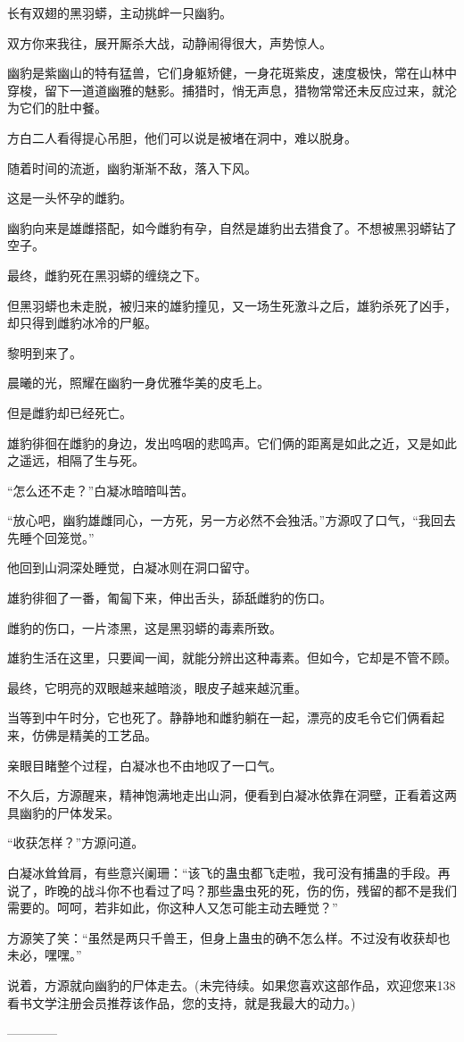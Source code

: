 \begin{this_body}
长有双翅的黑羽蟒，主动挑衅一只幽豹。

双方你来我往，展开厮杀大战，动静闹得很大，声势惊人。

幽豹是紫幽山的特有猛兽，它们身躯矫健，一身花斑紫皮，速度极快，常在山林中穿梭，留下一道道幽雅的魅影。捕猎时，悄无声息，猎物常常还未反应过来，就沦为它们的肚中餐。

方白二人看得提心吊胆，他们可以说是被堵在洞中，难以脱身。

随着时间的流逝，幽豹渐渐不敌，落入下风。

这是一头怀孕的雌豹。

幽豹向来是雄雌搭配，如今雌豹有孕，自然是雄豹出去猎食了。不想被黑羽蟒钻了空子。

最终，雌豹死在黑羽蟒的缠绕之下。

但黑羽蟒也未走脱，被归来的雄豹撞见，又一场生死激斗之后，雄豹杀死了凶手，却只得到雌豹冰冷的尸躯。

黎明到来了。

晨曦的光，照耀在幽豹一身优雅华美的皮毛上。

但是雌豹却已经死亡。

雄豹徘徊在雌豹的身边，发出呜咽的悲鸣声。它们俩的距离是如此之近，又是如此之遥远，相隔了生与死。

“怎么还不走？”白凝冰暗暗叫苦。

“放心吧，幽豹雄雌同心，一方死，另一方必然不会独活。”方源叹了口气，“我回去先睡个回笼觉。”

他回到山洞深处睡觉，白凝冰则在洞口留守。

雄豹徘徊了一番，匍匐下来，伸出舌头，舔舐雌豹的伤口。

雌豹的伤口，一片漆黑，这是黑羽蟒的毒素所致。

雄豹生活在这里，只要闻一闻，就能分辨出这种毒素。但如今，它却是不管不顾。

最终，它明亮的双眼越来越暗淡，眼皮子越来越沉重。

当等到中午时分，它也死了。静静地和雌豹躺在一起，漂亮的皮毛令它们俩看起来，仿佛是精美的工艺品。

亲眼目睹整个过程，白凝冰也不由地叹了一口气。

不久后，方源醒来，精神饱满地走出山洞，便看到白凝冰依靠在洞壁，正看着这两具幽豹的尸体发呆。

“收获怎样？”方源问道。

白凝冰耸耸肩，有些意兴阑珊：“该飞的蛊虫都飞走啦，我可没有捕蛊的手段。再说了，昨晚的战斗你不也看过了吗？那些蛊虫死的死，伤的伤，残留的都不是我们需要的。呵呵，若非如此，你这种人又怎可能主动去睡觉？”

方源笑了笑：“虽然是两只千兽王，但身上蛊虫的确不怎么样。不过没有收获却也未必，嘿嘿。”

说着，方源就向幽豹的尸体走去。(未完待续。如果您喜欢这部作品，欢迎您来138看书文学注册会员推荐该作品，您的支持，就是我最大的动力。)

------------

\end{this_body}

